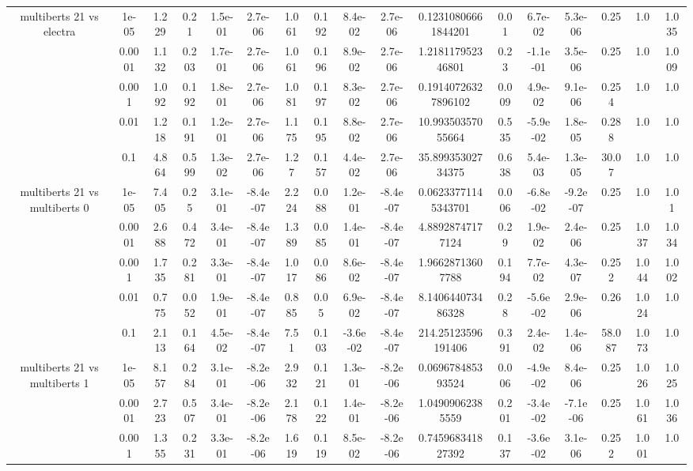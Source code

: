 \begin{tabular}{|c|c|c|c|c|c|c|c|c|c|c|c|c|c|c|c|c|}
\hline
\multirow{5}{*}{multiberts 21 vs electra } & 1e-05 & 1.229 & 0.21 & 1.5e-01 & 2.7e-06 & 1.061 & 0.192 & 8.4e-02 & 2.7e-06 & 0.12310806661844201 & 0.01 & 6.7e-02 & 5.3e-06 & 0.25 & 1.0 & 1.035 \\
 & 0.0001 & 1.132 & 0.203 & 1.7e-01 & 2.7e-06 & 1.061 & 0.196 & 8.9e-02 & 2.7e-06 & 1.218117952346801 & 0.23 & -1.1e-01 & 3.5e-06 & 0.25 & 1.0 & 1.009 \\
 & 0.001 & 1.092 & 0.192 & 1.8e-01 & 2.7e-06 & 1.081 & 0.197 & 8.3e-02 & 2.7e-06 & 0.19140726327896102 & 0.009 & 4.9e-02 & 9.1e-06 & 0.254 & 1.0 & 1.0 \\
 & 0.01 & 1.218 & 0.191 & 1.2e-01 & 2.7e-06 & 1.175 & 0.195 & 8.8e-02 & 2.7e-06 & 10.99350357055664 & 0.535 & -5.9e-02 & 1.8e-05 & 0.288 & 1.0 & 1.0 \\
 & 0.1 & 4.864 & 0.599 & 1.3e-02 & 2.7e-06 & 1.27 & 0.157 & 4.4e-02 & 2.7e-06 & 35.89935302734375 & 0.638 & 5.4e-03 & 1.3e-05 & 30.07 & 1.0 & 1.0 \\
\hline
\multirow{5}{*}{multiberts 21 vs multiberts 0} & 1e-05 & 7.405 & 0.25 & 3.1e-01 & -8.4e-07 & 2.224 & 0.088 & 1.2e-01 & -8.4e-07 & 0.06233771145343701 & 0.006 & -6.8e-02 & -9.2e-07 & 0.25 & 1.0 & 1.01 \\
 & 0.0001 & 2.688 & 0.472 & 3.4e-01 & -8.4e-07 & 1.389 & 0.085 & 1.4e-01 & -8.4e-07 & 4.88928747177124 & 0.29 & 1.9e-02 & 2.4e-06 & 0.25 & 1.037 & 1.034 \\
 & 0.001 & 1.735 & 0.281 & 3.3e-01 & -8.4e-07 & 1.017 & 0.086 & 8.6e-02 & -8.4e-07 & 1.96628713607788 & 0.194 & 7.7e-02 & 4.3e-07 & 0.252 & 1.044 & 1.002 \\
 & 0.01 & 0.775 & 0.052 & 1.9e-01 & -8.4e-07 & 0.885 & 0.05 & 6.9e-02 & -8.4e-07 & 8.140644073486328 & 0.28 & -5.6e-02 & 2.9e-06 & 0.26 & 1.024 & 1.0 \\
 & 0.1 & 2.113 & 0.164 & 4.5e-02 & -8.4e-07 & 7.51 & 0.103 & -3.6e-02 & -8.4e-07 & 214.25123596191406 & 0.391 & 2.4e-02 & 1.4e-06 & 58.087 & 1.073 & 1.0 \\
\hline
\multirow{5}{*}{multiberts 21 vs multiberts 1} & 1e-05 & 8.157 & 0.284 & 3.1e-01 & -8.2e-06 & 2.932 & 0.121 & 1.3e-01 & -8.2e-06 & 0.069678485393524 & 0.006 & -4.9e-02 & 8.4e-06 & 0.25 & 1.026 & 1.025 \\
 & 0.0001 & 2.723 & 0.507 & 3.4e-01 & -8.2e-06 & 2.178 & 0.122 & 1.4e-01 & -8.2e-06 & 1.04909062385559 & 0.201 & -3.4e-02 & -7.1e-06 & 0.25 & 1.061 & 1.036 \\
 & 0.001 & 1.355 & 0.231 & 3.3e-01 & -8.2e-06 & 1.619 & 0.119 & 8.5e-02 & -8.2e-06 & 0.745968341827392 & 0.137 & -3.6e-02 & 3.1e-06 & 0.252 & 1.001 & 1.0 \\

\end{tabular}
